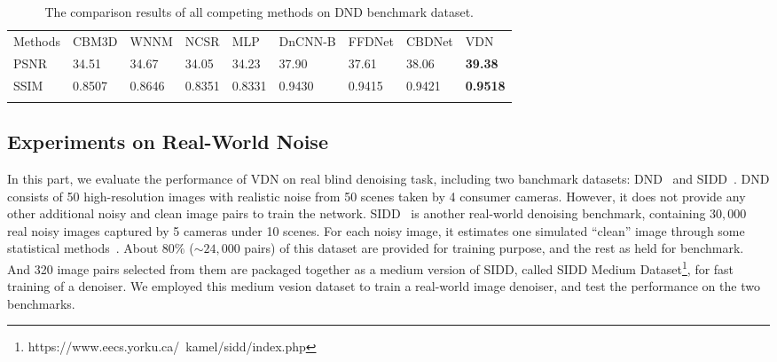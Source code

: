 \documentclass{article}
\begin{document}
\begin{table}[!t]
    \centering\vspace{-1mm}
    \caption{\small{The comparison results of all competing methods on DND benchmark dataset.}}\vspace{-2mm}
    \scriptsize
    \begin{tabular}{@{}C{1.5cm}@{}|@{}C{1.6cm}@{}@{}C{1.5cm}@{}@{}C{1.5cm}@{}@{}C{1.3cm}@{}@{}C{1.5cm}@{}@{}C{1.5cm}@{}
        @{}C{1.6cm}@{}@{}C{1.8cm}@{}}
        \Xhline{0.8pt}
        Methods & CBM3D    & WNNM    & NCSR   & MLP    & DnCNN-B          & FFDNet & CBDNet          & VDN \\
        \Xhline{0.4pt}
        PSNR    &34.51     & 34.67   & 34.05  & 34.23  & 37.90            & 37.61  &38.06            & \textbf{39.38}  \\
        \Xhline{0.4pt}     
        SSIM    &0.8507    & 0.8646  & 0.8351 & 0.8331 &0.9430            & 0.9415 &0.9421           & \textbf{0.9518}  \\
        \Xhline{0.8pt}
    \end{tabular}
    \label{tab:PSNR-DND}
    \vspace{-3mm}
\end{table}

\vspace{-4mm}\subsection{Experiments on Real-World Noise}\vspace{-2mm}
In this part, we evaluate the performance of VDN on real blind denoising task, including two banchmark
datasets: DND~\cite{plotz2017benchmarking} and SIDD~\cite{Abdelhamed_2018_CVPR}. DND consists of 50
high-resolution images with realistic noise from 50 scenes taken by 4 consumer cameras.
However, it does not provide any other additional noisy and clean image pairs to train the network.
SIDD~\cite{Abdelhamed_2018_CVPR} is another real-world denoising benchmark, containing $30,000$ real noisy images captured
by 5 cameras under 10 scenes. For each noisy image, it estimates one simulated ``clean'' image through
some statistical methods~\cite{Abdelhamed_2018_CVPR}.
About 80$\%$ ($\sim 24,000$ pairs) of this dataset are provided for training purpose, and the rest as held for benchmark.
And 320 image pairs selected from them are packaged together as a medium version of SIDD, called SIDD Medium
Dataset\footnote{\label{foot:SIDD}https://www.eecs.yorku.ca/~kamel/sidd/index.php},
for fast training of a denoiser.
We employed this medium vesion dataset to train a real-world image denoiser, and test the performance on the two benchmarks.
\end{document}
